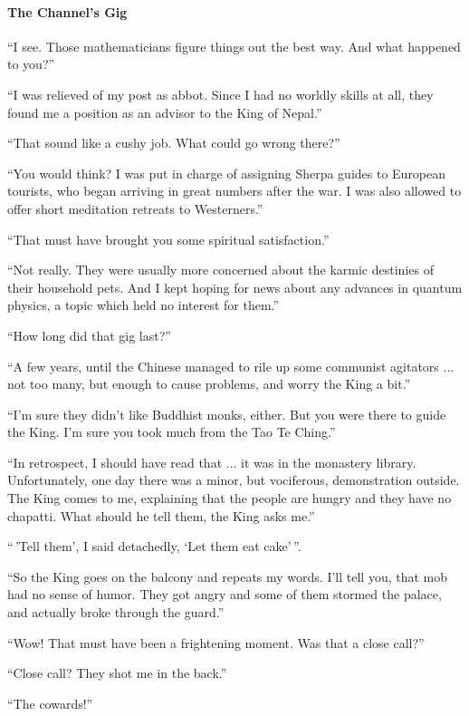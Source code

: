 \paragraph{The Channel’s Gig}

``I see. Those mathematicians figure things out the best way. And what happened to you?''

``I was relieved of my post as abbot. Since I had no worldly skills at all, they found me a position as an advisor to the King of Nepal.''

``That sound like a cushy job. What could go wrong there?''

``You would think? I was put in charge of assigning Sherpa guides to European tourists, who began arriving in great numbers after the war. I was also allowed to offer short meditation retreats to Westerners.''

``That must have brought you some spiritual satisfaction.''

``Not really. They were usually more concerned about the karmic destinies of their household pets. And I kept hoping for news about any advances in quantum physics, a topic which held no interest for them.''

``How long did that gig last?''

``A few years, until the Chinese managed to rile up some communist agitators ... not too many, but enough to cause problems, and worry the King a bit.''

``I'm sure they didn't like Buddhist monks, either. But you were there to guide the King. I'm sure you took much from the Tao Te Ching.''

``In retrospect, I should have read that ... it was in the monastery library. Unfortunately, one day there was a minor, but vociferous, demonstration outside. The King comes to me, explaining that the people are hungry and they have no chapatti. What should he tell them, the King asks me.''

``\,'Tell them', I said detachedly, `Let them eat cake'\,''.

``So the King goes on the balcony and repeats my words. I'll tell you, that mob had no sense of humor. They got angry and some of them stormed the palace, and actually broke through the guard.''

``Wow! That must have been a frightening moment. Was that a close call?''

``Close call? They shot me in the back.''

``The cowards!''

